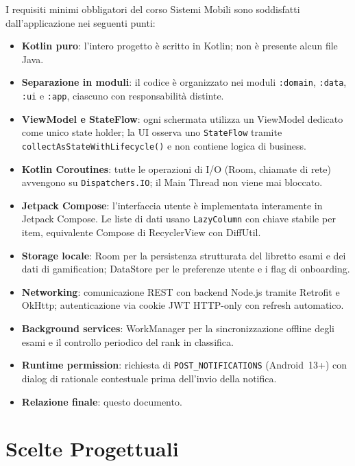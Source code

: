 \documentclass[a4paper,12pt]{report}
\begin{document}
    I requisiti minimi obbligatori del corso Sistemi Mobili sono soddisfatti dall'applicazione
    nei seguenti punti:

    \begin{itemize}
        \item \textbf{Kotlin puro}: l'intero progetto è scritto in Kotlin; non è presente alcun file Java.
        \item \textbf{Separazione in moduli}: il codice è organizzato nei moduli \texttt{:domain},
        \texttt{:data}, \texttt{:ui} e \texttt{:app}, ciascuno con responsabilità distinte.
        \item \textbf{ViewModel e StateFlow}: ogni schermata utilizza un ViewModel dedicato
        come unico state holder; la UI osserva uno \texttt{StateFlow}
        tramite \texttt{collectAsStateWithLifecycle()} e non contiene logica di business.
        \item \textbf{Kotlin Coroutines}: tutte le operazioni di I/O (Room, chiamate di rete) avvengono
        su \texttt{Dispatchers.IO}; il Main Thread non viene mai bloccato.
        \item \textbf{Jetpack Compose}: l'interfaccia utente è implementata interamente in Jetpack
        Compose. Le liste di dati usano \texttt{LazyColumn} con chiave stabile per item,
        equivalente Compose di RecyclerView con DiffUtil.
        \item \textbf{Storage locale}: Room per la persistenza strutturata del libretto esami e dei
        dati di gamification; DataStore per le preferenze utente e i flag di onboarding.
        \item \textbf{Networking}: comunicazione REST con backend Node.js tramite Retrofit e OkHttp;
        autenticazione via cookie JWT HTTP-only con refresh automatico.
        \item \textbf{Background services}: WorkManager per la sincronizzazione offline degli esami
        e il controllo periodico del rank in classifica.
        \item \textbf{Runtime permission}: richiesta di \texttt{POST\_NOTIFICATIONS} (Android~13+)
        con dialog di rationale contestuale prima dell'invio della notifica.
        \item \textbf{Relazione finale}: questo documento.
    \end{itemize}

    \chapter{Scelte Progettuali}
\end{document}

